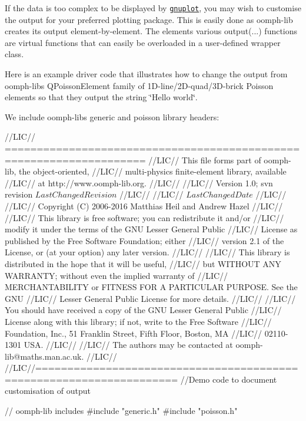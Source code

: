 If the data is too complex to be displayed by \href{http://www.gnuplot.info}{\tt gnuplot}, you may wish to customise the output for your preferred plotting package. This is easily done as {\ttfamily oomph-\/lib} creates its output element-\/by-\/element. The elements\textquotesingle{} various {\ttfamily output}(...) functions are virtual functions that can easily be overloaded in a user-\/defined wrapper class.

Here is an example driver code that illustrates how to change the output from {\ttfamily oomph-\/lib\textquotesingle{}s} {\ttfamily Q\+Poisson\+Element} family of 1\+D-\/line/2\+D-\/quad/3\+D-\/brick Poisson elements so that they output the string \char`\"{}\+Hello world\char`\"{}.

We include {\ttfamily oomph-\/lib\textquotesingle{}s} {\ttfamily generic} and {\ttfamily poisson} library headers\+:  
\begin{DoxyCodeInclude}
\textcolor{comment}{//LIC// ====================================================================}
\textcolor{comment}{//LIC// This file forms part of oomph-lib, the object-oriented, }
\textcolor{comment}{//LIC// multi-physics finite-element library, available }
\textcolor{comment}{//LIC// at http://www.oomph-lib.org.}
\textcolor{comment}{//LIC// }
\textcolor{comment}{//LIC//    Version 1.0; svn revision $LastChangedRevision$}
\textcolor{comment}{//LIC//}
\textcolor{comment}{//LIC// $LastChangedDate$}
\textcolor{comment}{//LIC// }
\textcolor{comment}{//LIC// Copyright (C) 2006-2016 Matthias Heil and Andrew Hazel}
\textcolor{comment}{//LIC// }
\textcolor{comment}{//LIC// This library is free software; you can redistribute it and/or}
\textcolor{comment}{//LIC// modify it under the terms of the GNU Lesser General Public}
\textcolor{comment}{//LIC// License as published by the Free Software Foundation; either}
\textcolor{comment}{//LIC// version 2.1 of the License, or (at your option) any later version.}
\textcolor{comment}{//LIC// }
\textcolor{comment}{//LIC// This library is distributed in the hope that it will be useful,}
\textcolor{comment}{//LIC// but WITHOUT ANY WARRANTY; without even the implied warranty of}
\textcolor{comment}{//LIC// MERCHANTABILITY or FITNESS FOR A PARTICULAR PURPOSE.  See the GNU}
\textcolor{comment}{//LIC// Lesser General Public License for more details.}
\textcolor{comment}{//LIC// }
\textcolor{comment}{//LIC// You should have received a copy of the GNU Lesser General Public}
\textcolor{comment}{//LIC// License along with this library; if not, write to the Free Software}
\textcolor{comment}{//LIC// Foundation, Inc., 51 Franklin Street, Fifth Floor, Boston, MA}
\textcolor{comment}{//LIC// 02110-1301  USA.}
\textcolor{comment}{//LIC// }
\textcolor{comment}{//LIC// The authors may be contacted at oomph-lib@maths.man.ac.uk.}
\textcolor{comment}{//LIC// }
\textcolor{comment}{//LIC//====================================================================}
\textcolor{comment}{//Demo code to document customisation of output}

\textcolor{comment}{// oomph-lib includes}
\textcolor{preprocessor}{#include "generic.h"}
\textcolor{preprocessor}{#include "poisson.h"}

\end{DoxyCodeInclude}


